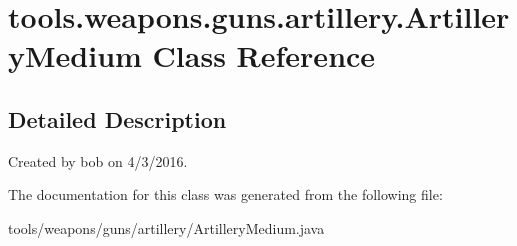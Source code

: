 \hypertarget{classtools_1_1weapons_1_1guns_1_1artillery_1_1_artillery_medium}{}\section{tools.\+weapons.\+guns.\+artillery.\+Artillery\+Medium Class Reference}
\label{classtools_1_1weapons_1_1guns_1_1artillery_1_1_artillery_medium}


\subsection{Detailed Description}
Created by bob on 4/3/2016. 

The documentation for this class was generated from the following file\+:\begin{DoxyCompactItemize}
\item 
tools/weapons/guns/artillery/Artillery\+Medium.\+java\end{DoxyCompactItemize}
